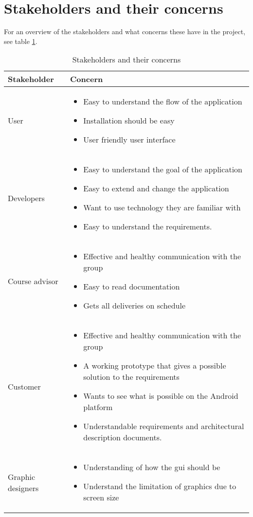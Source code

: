 \newpage

\section{Stakeholders and their concerns}
For an overview of the stakeholders and what concerns these have in the project, see table \ref{tab:stakeholders}.

\begin{table}[h!]
\begin{tabular}{p{3.5cm}|p{11.5cm}} \hline
\textbf{Stakeholder} & \textbf{Concern} \\ \hline \hline
User & 
\begin{itemize}
\item{} Easy to understand the flow of the application
\item{} Installation should be easy
\item{} User friendly user interface
\end{itemize}\\ \hline
Developers & 
\begin{itemize}
\item{}Easy to understand the goal of the application
\item{}Easy to extend and change the application
\item{}Want to use technology they are familiar with
\item{}Easy to understand the requirements.
\end{itemize}\\ \hline
Course advisor & 
\begin{itemize}
\item{}Effective and healthy communication with the group
\item{}Easy to read documentation
\item{}Gets all deliveries on schedule
\end{itemize}\\ \hline
Customer & 
\begin{itemize}
\item{}Effective and healthy communication with the group
\item{}A working prototype that gives a possible solution to the requirements
\item{}Wants to see what is possible on the Android platform
\item{}Understandable requirements and architectural description documents.
\end{itemize}\\ \hline
Graphic designers & 
\begin{itemize}
\item{}Understanding of how the \gls{gui} should be
\item{}Understand the limitation of graphics due to screen size
\end{itemize} \\ \hline
\end{tabular}
\caption{Stakeholders and their concerns} \label{tab:stakeholders}
\end{table}
